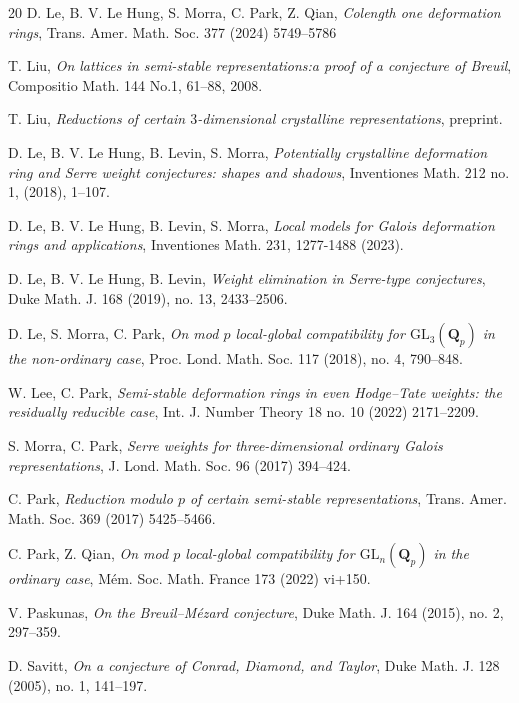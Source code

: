 \documentclass[11pt]{amsart}
\theoremstyle{definition}
\numberwithin{equation}{subsection}
\theoremstyle{plain}
\theoremstyle{plain}
\theoremstyle{plain}
\theoremstyle{plain}
\theoremstyle{plain}
\theoremstyle{plain}
\theoremstyle{plain}
\theoremstyle{plain}
\theoremstyle{plain}
\theoremstyle{plain}
\theoremstyle{plain}
\theoremstyle{plain}
\theoremstyle{definition}
\theoremstyle{definition}
\theoremstyle{definition}
\theoremstyle{remark}
\renewcommand{\(}{\textup{(}}
\renewcommand{\)}{\textup{)}}
\newcommand{\Q}{\mathbf{Q}}
\newcommand{\GL}{\mathrm{GL}}
\begin{document}
\begin{thebibliography}{20}
 D. Le, B. V. Le Hung, S. Morra, C. Park, Z. Qian, \emph{Colength one deformation rings}, Trans. Amer. Math. Soc. 377 (2024) 5749--5786


 T. Liu, \emph{On lattices in semi-stable representations:a proof of a conjecture of Breuil}, Compositio Math. 144 No.1, 61--88, 2008.

 T. Liu, \emph{Reductions of certain $3$-dimensional crystalline representations}, preprint.

 D. Le, B. V. Le Hung, B. Levin, S. Morra, \emph{Potentially crystalline deformation ring and Serre weight conjectures: shapes and shadows}, Inventiones Math. 212 no. 1, (2018), 1--107.

 D. Le, B. V. Le Hung, B. Levin, S. Morra, \emph{Local models for Galois deformation rings and applications}, Inventiones Math. 231, 1277-1488 (2023).


 D. Le, B. V. Le Hung, B. Levin, \emph{Weight elimination in Serre-type conjectures}, Duke Math. J. 168 (2019), no. 13, 2433--2506.


 D. Le, S. Morra, C. Park, \emph{On mod $p$ local-global compatibility for $\GL_3(\Q_p)$ in the non-ordinary case}, Proc. Lond. Math. Soc. 117 (2018), no. 4, 790--848.

 W. Lee, C. Park, \emph{Semi-stable deformation rings in even Hodge--Tate weights: the residually reducible case}, Int. J. Number Theory 18 no. 10 (2022) 2171--2209.



 S. Morra, C. Park, \emph{Serre weights for three-dimensional ordinary Galois representations}, J. Lond. Math. Soc. 96 (2017) 394--424.

 C. Park, \emph{Reduction modulo $p$ of certain semi-stable representations}, Trans. Amer. Math. Soc. 369 (2017) 5425--5466.

 C. Park, Z. Qian, \emph{On mod $p$ local-global compatibility for $\GL_n(\Q_p)$ in the ordinary case}, Mém. Soc. Math. France 173 (2022) vi+150.


 V. Paskunas, \emph{On the Breuil–M\'ezard conjecture}, Duke Math. J. 164 (2015), no. 2, 297–359.


 D. Savitt, \emph{On a conjecture of Conrad, Diamond, and Taylor}, Duke Math. J. 128 (2005), no. 1, 141--197.



\end{thebibliography}
\end{document}
